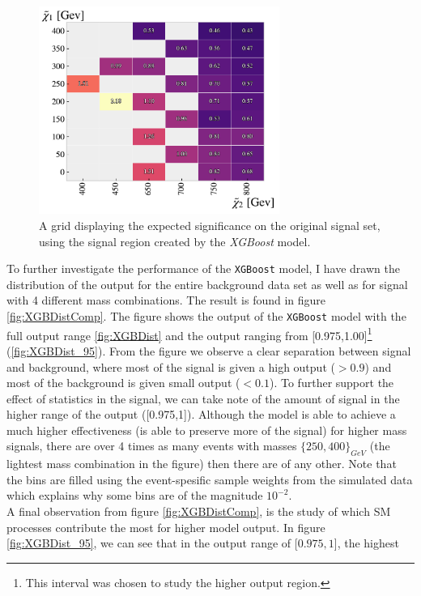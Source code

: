 \begin{figure}
    \centering
    \includegraphics[width=0.7\textwidth]{Figures/MLResults/XGB/SUSY/Grid/XGBGridSig.pdf}
    \caption{A grid displaying the expected significance on the original signal set, using the signal region 
    created by the \emph{XGBoost} model.}
    \label{fig:XGBoost}
\end{figure}
To further investigate the performance of the \verb!XGBoost! model, I have drawn the distribution of the output for the 
entire background data set as well as for signal with 4 different mass combinations. The result is found in figure 
\ref{fig:XGBDistComp}. The figure shows the output of the \verb!XGBoost! model with the full output range \ref{fig:XGBDist}
and the output ranging from [0.975,1.00]\footnote{This interval was chosen to study the higher output region.} (\ref{fig:XGBDist_95}). 
From the figure we observe a clear separation between signal and background, where most of the signal is given a high output ($>0.9$) 
and most of the background is given small output ($<0.1$). To further support the effect of statistics in the signal, we can take note of the 
amount of signal in the higher range of the output ([0.975,1]). Although the model is able to achieve a much higher 
effectiveness (is able to preserve more of the signal) for higher mass signals, there are over 4 times as many 
events with masses $\{250,400\}_{GeV}$ (the lightest mass combination in the figure) then there are of any other. Note 
that the bins are filled using the event-spesific sample weights from the simulated data which explains why some bins
are of the magnitude $10^{-2}$.
\\
A final observation from figure \ref{fig:XGBDistComp}, is the study of which \ac{SM} processes contribute the most 
for higher model output. In figure \ref{fig:XGBDist_95}, we can see that in the output range of [$0.975,1$], the highest 
